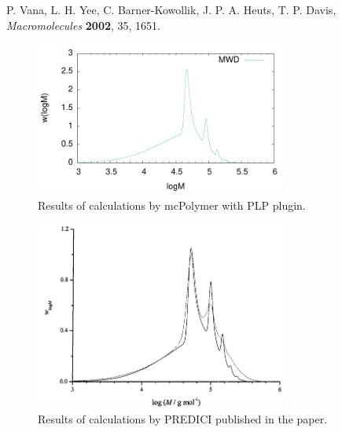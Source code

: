 \documentclass{article}
\begin{document}
P. Vana, L. H. Yee, C. Barner-Kowollik, J. P. A. Heuts, T. P. Davis, \textit{Macromolecules} \textbf{2002}, 35, 1651.

\begin{figure}[h]
\centering
\includegraphics[width=0.75\textwidth]{plp_example2.pdf}
\caption{Results of calculations by mcPolymer with PLP plugin.}
\end{figure}

\begin{figure}[h]
\centering
\includegraphics[width=0.75\textwidth]{Vana2002_PLP.png}
\caption{Results of calculations by PREDICI published in the paper.}
\end{figure}
\end{document}

